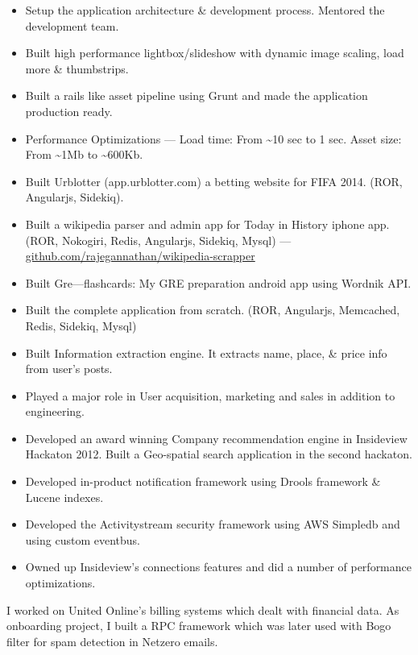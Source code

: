 \documentclass{resume}
\begin{document}
\begin{itemize} \itemsep1pt \parskip0pt
  \item Setup the application architecture \& development process. Mentored the development team.
  \item Built high performance lightbox/slideshow with dynamic image scaling, load more \& thumbstrips.
  \item Built a rails like asset pipeline using Grunt and made the application production ready.
  \item Performance Optimizations --- Load time: From \textasciitilde10 sec to 1 sec.  Asset size: From \textasciitilde1Mb to \textasciitilde600Kb.
\end{itemize}
\begin{itemize} \itemsep1pt \parskip0pt
  \item Built Urblotter (app.urblotter.com) a betting website for FIFA 2014. (ROR, Angularjs, Sidekiq).
  \item Built a wikipedia parser and admin app for Today in History iphone app. (ROR, Nokogiri, Redis, Angularjs, Sidekiq, Mysql) --- \url{github.com/rajegannathan/wikipedia-scrapper}
  \item Built Gre---flashcards: My GRE preparation android app using Wordnik API\@.
\end{itemize}
\begin{itemize} \itemsep1pt \parskip0pt
  \item Built the complete application from scratch. (ROR, Angularjs, Memcached, Redis, Sidekiq, Mysql)
  \item Built Information extraction engine. It extracts name, place, \& price info from user's posts.
  \item Played a major role in User acquisition, marketing and sales in addition to engineering. 
\end{itemize}
\begin{itemize} \itemsep1pt \parskip0pt
  \item Developed an award winning Company recommendation engine in Insideview Hackaton 2012.  Built a Geo-spatial search application in the second hackaton.
  \item Developed in-product notification framework using Drools framework \& Lucene indexes.
  \item Developed the Activitystream security framework using AWS Simpledb and using custom eventbus.
  \item Owned up Insideview's connections features and did a number of performance optimizations.
\end{itemize}
I worked on United Online's billing systems which dealt with financial data.  As onboarding project, I built a RPC framework which was later used with Bogo filter for spam detection in Netzero emails.
\end{document}
